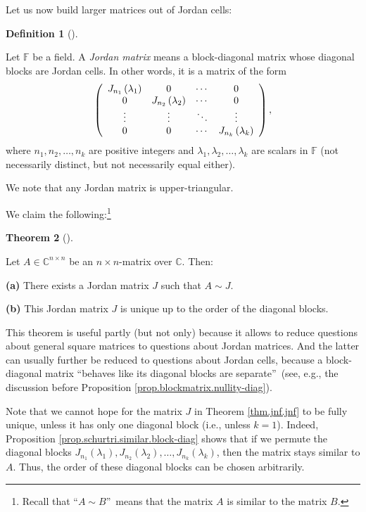 \documentclass[numbers=enddot,12pt,final,onecolumn,notitlepage]{scrartcl}%
\numberwithin{exer}{subsection}
\theoremstyle{definition}
\newtheorem{theo}{Theorem}[subsection]
\newenvironment{theorem}[1][]
{\begin{theo}[#1]\begin{leftbar}}
{\end{leftbar}\end{theo}}
\newtheorem{defi}[theo]{Definition}
\newenvironment{definition}[1][]
{\begin{defi}[#1]\begin{leftbar}}
{\end{leftbar}\end{defi}}
\begin{document}
Let us now build larger matrices out of Jordan cells:

\begin{definition}
\label{def.jnf.jmat}Let $\mathbb{F}$ be a field. A \emph{Jordan matrix} means
a block-diagonal matrix whose diagonal blocks are Jordan cells. In other
words, it is a matrix of the form%
\[
\left(
\begin{array}
[c]{cccc}%
J_{n_{1}}\left(  \lambda_{1}\right)  & 0 & \cdots & 0\\
0 & J_{n_{2}}\left(  \lambda_{2}\right)  & \cdots & 0\\
\vdots & \vdots & \ddots & \vdots\\
0 & 0 & \cdots & J_{n_{k}}\left(  \lambda_{k}\right)
\end{array}
\right)  ,
\]
where $n_{1},n_{2},\ldots,n_{k}$ are positive integers and $\lambda
_{1},\lambda_{2},\ldots,\lambda_{k}$ are scalars in $\mathbb{F}$ (not
necessarily distinct, but not necessarily equal either).
\end{definition}

We note that any Jordan matrix is upper-triangular. \medskip

We claim the following:\footnote{Recall that \textquotedblleft$A\sim
B$\textquotedblright\ means that the matrix $A$ is similar to the matrix $B$.}

\begin{theorem}
[Jordan canonical form theorem]\label{thm.jnf.jnf}Let $A\in\mathbb{C}^{n\times
n}$ be an $n\times n$-matrix over $\mathbb{C}$. Then: \medskip

\textbf{(a)} There exists a Jordan matrix $J$ such that $A\sim J$. \medskip

\textbf{(b)} This Jordan matrix $J$ is unique up to the order of the diagonal blocks.
\end{theorem}

This theorem is useful partly (but not only) because it allows to reduce
questions about general square matrices to questions about Jordan matrices.
And the latter can usually further be reduced to questions about Jordan cells,
because a block-diagonal matrix \textquotedblleft behaves like its diagonal
blocks are separate\textquotedblright\ (see, e.g., the discussion before
Proposition \ref{prop.blockmatrix.nullity-diag}).

Note that we cannot hope for the matrix $J$ in Theorem \ref{thm.jnf.jnf} to be
fully unique, unless it has only one diagonal block (i.e., unless $k=1$).
Indeed, Proposition \ref{prop.schurtri.similar.block-diag} shows that if we
permute the diagonal blocks $J_{n_{1}}\left(  \lambda_{1}\right)  ,J_{n_{2}%
}\left(  \lambda_{2}\right)  ,\ldots,J_{n_{k}}\left(  \lambda_{k}\right)  $,
then the matrix stays similar to $A$. Thus, the order of these diagonal blocks
can be chosen arbitrarily.
\end{document}
